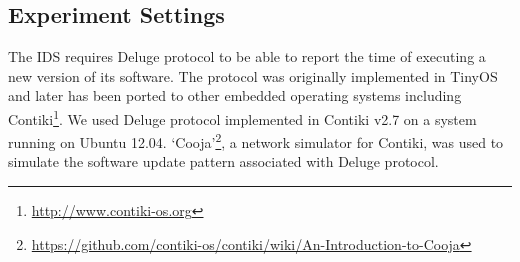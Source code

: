 \documentclass[conference]{IEEEtran}
\newcommand{\notedme}[1]{\raisebox{0pt}[0pt][0pt]{\pdfcomment[open=true,color=blue]{#1}}}
\newcommand*{\bd}[1]{\multicolumn{1}{|c|}{\bfseries #1}}
\begin{document}




\subsection*{Experiment Settings}
\label{subsec:sim_env}


The IDS requires Deluge protocol to be able to report the time of executing  a new version of its software.
The protocol was originally implemented in TinyOS and later has been ported to other embedded operating systems including Contiki\footnote{\url{http://www.contiki-os.org}}. 
We used Deluge protocol implemented in Contiki v2.7 on a system running on Ubuntu 12.04.
`Cooja'\footnote{\url{https://github.com/contiki-os/contiki/wiki/An-Introduction-to-Cooja}}, a network simulator for Contiki, was used to simulate the software update pattern associated with Deluge protocol.
\end{document}
